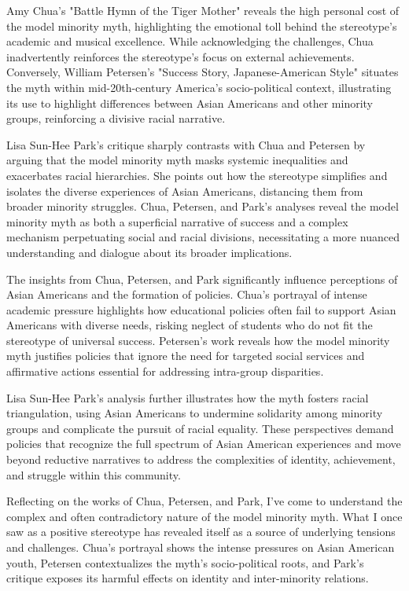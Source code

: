 \documentclass[12pt]{article}
\begin{document}
Amy Chua's "Battle Hymn of the Tiger Mother" reveals the high personal cost of the model minority myth, highlighting the emotional toll behind the stereotype's academic and musical excellence. While acknowledging the challenges, Chua inadvertently reinforces the stereotype's focus on external achievements. Conversely, William Petersen's "Success Story, Japanese-American Style" situates the myth within mid-20th-century America's socio-political context, illustrating its use to highlight differences between Asian Americans and other minority groups, reinforcing a divisive racial narrative.

Lisa Sun-Hee Park’s critique sharply contrasts with Chua and Petersen by arguing that the model minority myth masks systemic inequalities and exacerbates racial hierarchies. She points out how the stereotype simplifies and isolates the diverse experiences of Asian Americans, distancing them from broader minority struggles. Chua, Petersen, and Park's analyses reveal the model minority myth as both a superficial narrative of success and a complex mechanism perpetuating social and racial divisions, necessitating a more nuanced understanding and dialogue about its broader implications.

The insights from Chua, Petersen, and Park significantly influence perceptions of Asian Americans and the formation of policies. Chua's portrayal of intense academic pressure highlights how educational policies often fail to support Asian Americans with diverse needs, risking neglect of students who do not fit the stereotype of universal success. Petersen's work reveals how the model minority myth justifies policies that ignore the need for targeted social services and affirmative actions essential for addressing intra-group disparities.

Lisa Sun-Hee Park's analysis further illustrates how the myth fosters racial triangulation, using Asian Americans to undermine solidarity among minority groups and complicate the pursuit of racial equality. These perspectives demand policies that recognize the full spectrum of Asian American experiences and move beyond reductive narratives to address the complexities of identity, achievement, and struggle within this community.

Reflecting on the works of Chua, Petersen, and Park, I've come to understand the complex and often contradictory nature of the model minority myth. What I once saw as a positive stereotype has revealed itself as a source of underlying tensions and challenges. Chua's portrayal shows the intense pressures on Asian American youth, Petersen contextualizes the myth's socio-political roots, and Park's critique exposes its harmful effects on identity and inter-minority relations. 
\end{document}
